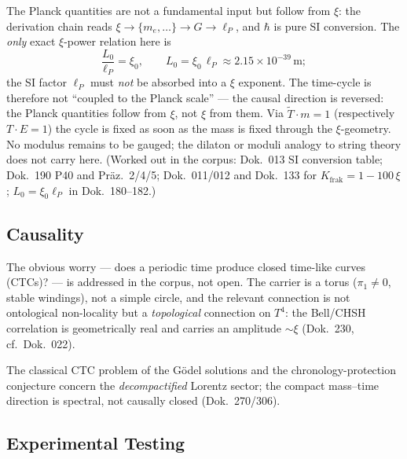 The Planck quantities are not a fundamental input but follow from $\xi$: the derivation chain reads $\xi \to \{m_e,\dots\} \to G \to \ell_P$, and $\hbar$ is pure SI conversion. The \emph{only} exact $\xi$-power relation here is
\[
 \frac{L_0}{\ell_P} = \xi_0, \qquad L_0 = \xi_0\,\ell_P \approx 2.15\times10^{-39}\,\text{m};
\]
the SI factor $\ell_P$ must \emph{not} be absorbed into a $\xi$ exponent. The time-cycle is therefore not ``coupled to the Planck scale'' --- the causal direction is reversed: the Planck quantities follow from $\xi$, not $\xi$ from them. Via $\tilde{T}\cdot m = 1$ (respectively $T\cdot E = 1$) the cycle is fixed as soon as the mass is fixed through the $\xi$-geometry. No modulus remains to be gauged; the dilaton or moduli analogy to string theory does not carry here. (Worked out in the corpus: Dok.~013 SI conversion table; Dok.~190 P40 and Präz.~2/4/5; Dok.~011/012 and Dok.~133 for $K_\text{frak}=1-100\,\xi$; $L_0=\xi_0\ell_P$ in Dok.~180--182.)

\subsection{Causality}

The obvious worry --- does a periodic time produce closed time-like curves (CTCs)? --- is addressed in the corpus, not open. The carrier is a torus ($\pi_1\neq0$, stable windings), not a simple circle, and the relevant connection is not ontological non-locality but a \emph{topological} connection on $T^4$: the Bell/CHSH correlation is geometrically real and carries an amplitude $\sim\xi$ (Dok.~230, cf.\ Dok.~022).

The classical CTC problem of the Gödel solutions and the chronology-protection conjecture concern the \emph{decompactified} Lorentz sector; the compact mass--time direction is spectral, not causally closed (Dok.~270/306).

\subsection{Experimental Testing}

